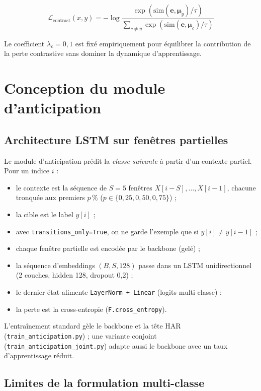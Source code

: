 $$\mathcal{L}_{\mathrm{contrast}}(x, y) = -\log \frac{\exp(\mathrm{sim}(\boldsymbol{e}, \boldsymbol{\mu}_y) / \tau)}{\sum_{c \neq y} \exp(\mathrm{sim}(\boldsymbol{e}, \boldsymbol{\mu}_c) / \tau)}$$

Le coefficient $\lambda_c = 0{,}1$ est fixé empiriquement pour équilibrer la contribution de la perte contrastive sans dominer la dynamique d'apprentissage.

\section{Conception du module d'anticipation}

\subsection{Architecture LSTM sur fenêtres partielles}

Le module d'anticipation prédit la \emph{classe suivante} à partir d'un
contexte partiel. Pour un indice $i$ :

\begin{itemize}
  \item le contexte est la séquence de $S=5$ fenêtres
  $X[i-S],\ldots,X[i-1]$, chacune tronquée aux premiers $p\,\%$
  ($p\in\{0{,}25,0{,}50,0{,}75\}$) ;
  \item la cible est le label $y[i]$ ;
  \item avec \texttt{transitions\_only=True}, on ne garde l'exemple que si
  $y[i]\neq y[i-1]$ ;
  \item chaque fenêtre partielle est encodée par le backbone (gelé) ;
  \item la séquence d'embeddings $(B,S,128)$ passe dans un LSTM
  unidirectionnel (2 couches, hidden 128, dropout 0,2) ;
  \item le dernier état alimente \texttt{LayerNorm + Linear} (logits
  multi-classe) ;
  \item la perte est la cross-entropie (\texttt{F.cross\_entropy}).
\end{itemize}

L'entraînement standard gèle le backbone et la tête HAR
(\texttt{train\_anticipation.py}) ; une variante conjoint
(\texttt{train\_anticipation\_joint.py}) adapte aussi le backbone avec un
taux d'apprentissage réduit.

\subsection{Limites de la formulation multi-classe}

